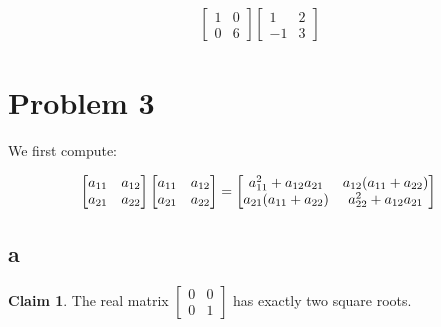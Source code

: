 \documentclass[12pt,letterpaper]{article}
\theoremstyle{definition}
\newtheorem*{claim}{Claim}
\begin{document}
\begin{align*}
\begin{bmatrix}
                                                                      1 & 0 \\
                                                                      0 & 6
                                                                    \end{bmatrix}
                                                                          \begin{bmatrix}
                                                                            1 & 2 \\
                                                                            -1 & 3
                                                                          \end{bmatrix}
\end{align*}

\section*{Problem 3}

We first compute:

\[
  \begin{bmatrix}
    a_{11} & a_{12} \\
    a_{21} & a_{22}
  \end{bmatrix}
  \begin{bmatrix}
    a_{11} & a_{12} \\
    a_{21} & a_{22}
  \end{bmatrix} = 
  \begin{bmatrix}
    a_{11}^2 + a_{12}a_{21} & a_{12}(a_{11} + a_{22}) \\
    a_{21}(a_{11} + a_{22}) & a_{22}^2 + a_{12}a_{21}
  \end{bmatrix} \\
\]

\subsection*{a}

\begin{claim}
  The real matrix $
  \begin{bmatrix}
    0 & 0 \\
    0 & 1
  \end{bmatrix}
  $ has exactly two square roots.
\end{claim}
\end{document}

